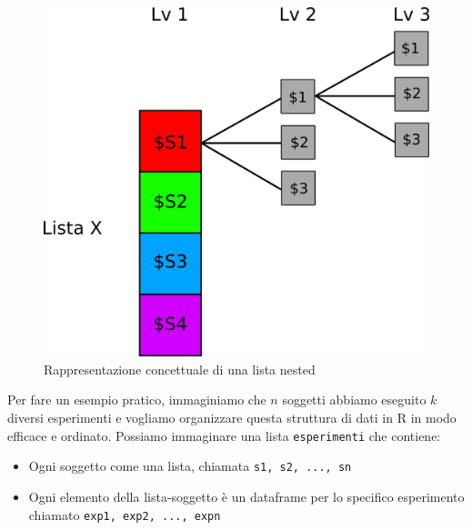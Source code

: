 \documentclass[
]{book}
\providecommand{\tightlist}{%
  \setlength{\itemsep}{0pt}\setlength{\parskip}{0pt}}
\begin{document}
\begin{figure}

{\centering \includegraphics[width=0.5\linewidth,height=0.5\textheight]{images/list_depth} 

}

\caption{Rappresentazione concettuale di una lista nested}\label{fig:list-depth}
\end{figure}

Per fare un esempio pratico, immaginiamo che \(n\) soggetti abbiamo eseguito \(k\) diversi esperimenti e vogliamo organizzare questa struttura di dati in R in modo efficace e ordinato. Possiamo immaginare una lista \texttt{esperimenti} che contiene:

\begin{itemize}
\tightlist
\item
  Ogni soggetto come una lista, chiamata \texttt{s1,\ s2,\ ...,\ sn}
\item
  Ogni elemento della lista-soggetto è un dataframe per lo specifico esperimento chiamato \texttt{exp1,\ exp2,\ ...,\ expn}
\end{itemize}
\end{document}
